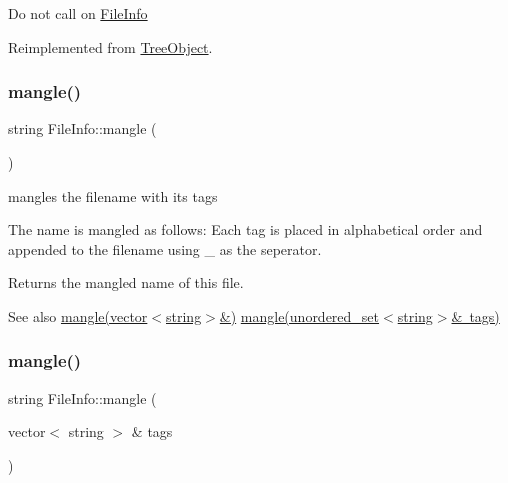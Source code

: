 Do not call on \mbox{\hyperlink{classFileInfo}{File\+Info}} 

Reimplemented from \mbox{\hyperlink{classTreeObject_afcc4b3928d2b77ff080aa229a9706215}{Tree\+Object}}.

\mbox{\label{classFileInfo_a96827c2e48fb1a15d468e9afd545383e}} 
\subsubsection{\texorpdfstring{mangle()}{mangle()}\hspace{0.1cm}{\footnotesize\ttfamily [1/3]}}
{\footnotesize\ttfamily string File\+Info\+::mangle (\begin{DoxyParamCaption}{ }\end{DoxyParamCaption})}



mangles the filename with its tags 

The name is mangled as follows\+: Each tag is placed in alphabetical order and appended to the filename using \textquotesingle{}\+\_\+\textquotesingle{} as the seperator.

\begin{DoxyReturn}{Returns}
the mangled name of this file. 
\end{DoxyReturn}
\begin{DoxySeeAlso}{See also}
\mbox{\hyperlink{classFileInfo_a105ad751f21bead6fc2a76e79cb3b701}{mangle(vector$<$string$>$\&)}} \mbox{\hyperlink{classFileInfo_aec8a60addbed54097f6cac0a6a516717}{mangle(unordered\+\_\+set$<$string$>$\& tags)}} 
\end{DoxySeeAlso}
\mbox{\label{classFileInfo_a105ad751f21bead6fc2a76e79cb3b701}} 
\subsubsection{\texorpdfstring{mangle()}{mangle()}\hspace{0.1cm}{\footnotesize\ttfamily [2/3]}}
{\footnotesize\ttfamily string File\+Info\+::mangle (\begin{DoxyParamCaption}\item[{vector$<$ string $>$ \&}]{tags }\end{DoxyParamCaption})}



